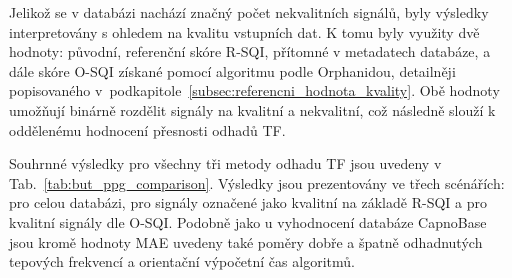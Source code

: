 Jelikož se v databázi nachází značný počet nekvalitních signálů, byly výsledky interpretovány s ohledem na kvalitu vstupních dat.
K tomu byly využity dvě hodnoty: původní, referenční skóre \acs{R-SQI}, přítomné v metadatech databáze, a dále skóre \acs{O-SQI} získané pomocí algoritmu podle Orphanidou, detailněji popisovaného v~podkapitole~\ref{subsec:referencni_hodnota_kvality}.
Obě hodnoty umožňují binárně rozdělit signály na kvalitní a nekvalitní, což následně slouží k oddělenému hodnocení přesnosti odhadů \acs{TF}.

Souhrnné výsledky pro všechny tři metody odhadu \acs{TF} jsou uvedeny v Tab.~\ref{tab:but_ppg_comparison}.
Výsledky jsou prezentovány ve třech scénářích: pro celou databázi, pro signály označené jako kvalitní na základě \acs{R-SQI} a pro kvalitní signály dle \acs{O-SQI}.
Podobně jako u vyhodnocení databáze CapnoBase jsou kromě hodnoty \acs{MAE} uvedeny také poměry dobře a špatně odhadnutých tepových frekvencí a orientační výpočetní čas algoritmů.

\begin{table}[!ht]
	\centering
	\caption[Srovnání metod odhadu TF na databázi BUT PPG]{Srovnání metod odhadu TF.}
	\label{tab:but_ppg_comparison}
\end{table}


